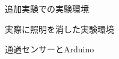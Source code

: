 \begin{figure}[H]
    \centering
    \caption{追加実験での実験環境}
    \label{fig:addgaiyo}
\end{figure}
\begin{figure}[H]
    \centering
    \caption{実際に照明を消した実験環境}
    \label{fig:siten2}
\end{figure}

\begin{figure}[H]
    \centering
    \caption{通過センサーとArduino}
    \label{fig:13.1}
\end{figure}

